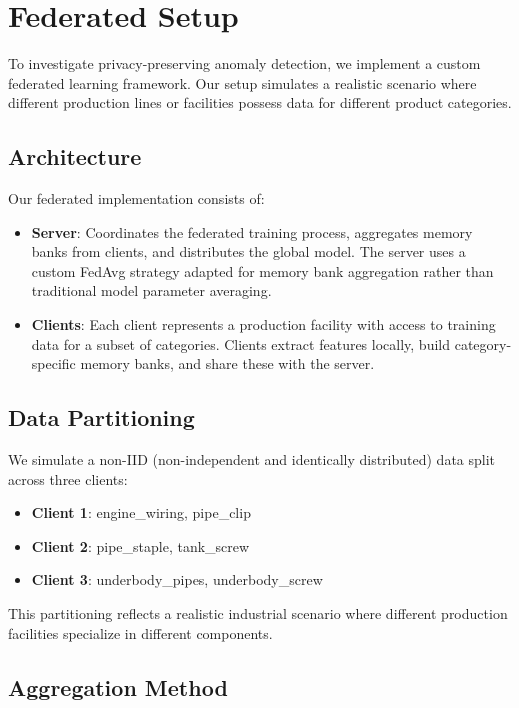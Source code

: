 \documentclass{article}
\begin{document}
\section{Federated Setup}

To investigate privacy-preserving anomaly detection, we implement a custom federated learning framework. Our setup simulates a realistic scenario where different production lines or facilities possess data for different product categories.

\subsection{Architecture}

Our federated implementation consists of:

\begin{itemize}
    \item \textbf{Server}: Coordinates the federated training process, aggregates memory banks from clients, and distributes the global model. The server uses a custom FedAvg strategy adapted for memory bank aggregation rather than traditional model parameter averaging.

    \item \textbf{Clients}: Each client represents a production facility with access to training data for a subset of categories. Clients extract features locally, build category-specific memory banks, and share these with the server.
\end{itemize}

\subsection{Data Partitioning}

We simulate a non-IID (non-independent and identically distributed) data split across three clients:

\begin{itemize}
    \item \textbf{Client 1}: engine\_wiring, pipe\_clip
    \item \textbf{Client 2}: pipe\_staple, tank\_screw
    \item \textbf{Client 3}: underbody\_pipes, underbody\_screw
\end{itemize}

This partitioning reflects a realistic industrial scenario where different production facilities specialize in different components.

\subsection{Aggregation Method}
\end{document}
